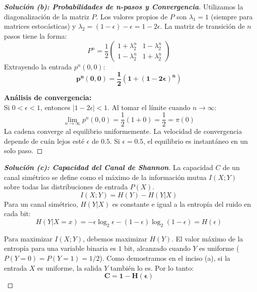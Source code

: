 \documentclass[10pt,a4paper]{article}
\begin{document}
\vspace{5mm}

\begin{proof}[\textbf{Solución (b): Probabilidades de n-pasos y Convergencia}]
    Utilizamos la diagonalización de la matriz $P$. Los valores propios de $P$ son $\lambda_1 = 1$ (siempre para matrices estocásticas) y $\lambda_2 = (1-\epsilon) - \epsilon = 1-2\epsilon$.
    La matriz de transición de $n$ pasos tiene la forma:
    \[ P^n = \frac{1}{2} \begin{pmatrix} 1+\lambda_2^n & 1-\lambda_2^n \\ 1-\lambda_2^n & 1+\lambda_2^n \end{pmatrix} \]
    Extrayendo la entrada $p^n(0,0)$:
    \[ \mathbf{p^n(0,0) = \frac{1}{2}(1 + (1 - 2\epsilon)^n)} \]
    
    \textbf{Análisis de convergencia:} \\
    Si $0 < \epsilon < 1$, entonces $|1-2\epsilon| < 1$. Al tomar el límite cuando $n \to \infty$:
    \[ \lim_{n \to \infty} p^n(0,0) = \frac{1}{2}(1 + 0) = \frac{1}{2} = \pi(0) \]
    La cadena converge al equilibrio uniformemente. La velocidad de convergencia depende de cuán lejos esté $\epsilon$ de $0.5$. Si $\epsilon = 0.5$, el equilibrio es instantáneo en un solo paso.
\end{proof}

\vspace{5mm}

\begin{proof}[\textbf{Solución (c): Capacidad del Canal de Shannon}]
    La capacidad $C$ de un canal simétrico se define como el máximo de la información mutua $I(X;Y)$ sobre todas las distribuciones de entrada $P(X)$. 
    \[ I(X;Y) = H(Y) - H(Y|X) \]
    Para un canal simétrico, $H(Y|X)$ es constante e igual a la entropía del ruido en cada bit:
    \[ H(Y|X=x) = -\epsilon \log_2 \epsilon - (1-\epsilon) \log_2 (1-\epsilon) = H(\epsilon) \]
    
    Para maximizar $I(X;Y)$, debemos maximizar $H(Y)$. El valor máximo de la entropía para una variable binaria es $1$ bit, alcanzado cuando $Y$ es uniforme ($P(Y=0)=P(Y=1)=1/2$). Como demostramos en el inciso (a), si la entrada $X$ es uniforme, la salida $Y$ también lo es.
    Por lo tanto:
    \[ \mathbf{C = 1 - H(\epsilon)} \]
\end{proof}

\vspace{5mm}
\end{document}

